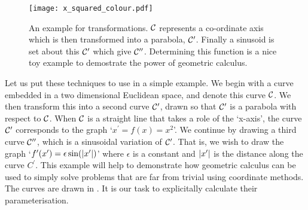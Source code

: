 \begin{figure}%
 \centering
 \texttt{[image: x\_squared\_colour.pdf]}
 \caption{An example for transformations.
   ${\cal C}$ represents a co-ordinate axis which is then transformed into a
 parabola, ${\cal C}^\prime$.  Finally a sinusoid is set about this
 ${\cal C}^\prime$ which give  ${\cal C}^{\prime\prime}$.
 Determining this function is a nice toy example to demostrate the
 power of geometric calculus.
}
 \label{fig:example_plots}
\end{figure}
Let us put these techniques to use in a simple example.
We begin with a curve embedded in a two dimensional Euclidean space,
and denote this curve ${\cal C}$.
We then transform this into a second curve ${\cal C}^\prime$,
drawn so that ${\cal C}^\prime$ is a parabola with respect to ${\cal C}$.
When ${\cal C}$ is a straight line that takes a role of the `x-axis',
the curve ${\cal C}^\prime$ corresponds to the graph `$x^\prime = f(x) = x^2$'.
We continue by drawing a third curve ${\cal C}^{\prime\prime}$,
which is a sinusoidal variation of ${\cal C}^\prime$. 
That is, we wish to draw the graph `$f^\prime(x^\prime) = \epsilon \sin(\left| x^\prime \right|)$' where
$\epsilon$ is a constant and $\left| x^\prime \right|$ is the distance along
the curve $C^\prime$.
This example  will help to demonstrate how geometric calculus can be used to simply
solve problems that are far from trivial using coordinate methods.
The curves are drawn in .  
It is our task to explicitally calculate their parameterisation.







